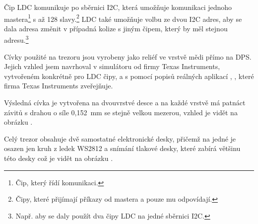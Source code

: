 Čip LDC komunikuje po sběrnici I2C, která umožňuje komunikaci jednoho mastera\footnote{Čip, který řídí komunikaci.} s až 128 slavy.\footnote{Čipy, které přijímají příkazy od mastera a pouze mu odpovídají.} LDC také umožňuje volbu ze dvou I2C adres, aby se dala adresa změnit v případná 
kolize s jiným čipem, který by měl stejnou adresu.\footnote{Např. aby se daly použít dva čipy LDC na jedné sběrnici I2C.}

\newpage

Cívky použité na trezoru jsou vyrobeny jako reliéf ve vrstvě mědi přímo na DPS. Jejich vzhled jsem navrhoval v simulátoru od firmy Texas Instruments, 
vytvořeném konkrétně pro LDC čipy, a s pomocí popisů reálných aplikací \parencite{LDC-cd0}, \parencite{LDC-cd1}, které firma Texas Instruments zveřejňuje.


Výsledná cívka je vytvořena na dvouvrstvé desce a na každé vrstvě má patnáct závitů s drahou o síle 0,152~mm se stejně velkou mezerou, 
vzhled je vidět na obrázku .

Celý trezor obsahuje dvě samostatné elektronické desky, přičemž na jedné je osazen jen kruh z ledek WS2812 a snímání tlakové desky, které zabírá 
většinu této desky což je vidět na obrázku .

\newpage